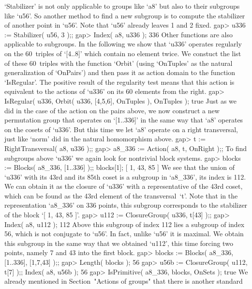 `Stabilizer' is not only applicable to groups like `a8' but also to their
subgroups like  `u56'. So another  method  to find  a  new subgroup is to
compute the stabilizer of another point in `u56'. Note that `u56' already
leaves 1 and 2 fixed.
\beginexample
gap> u336 := Stabilizer( u56, 3 );;
gap> Index( a8, u336 );
336 
\endexample
Other  functions  are also applicable  to  subgroups. In the following we
show that  `u336' operates regularly on the  60~triples of `[4..8]' which
contain no element twice. We  constuct the list  of these 60~triples with
the function `Orbit' (using `OnTuples'  as the natural generalization  of
`OnPairs')  and   then  pass it   as  action domain  to   the function
`IsRegular'.  The positive result of  the regularity test means that this
action is equivalent  to the actions of `u336'  on  its 60 elements
from the right.
\beginexample
gap> IsRegular( u336, Orbit( u336, [4,5,6], OnTuples ), OnTuples );
true 
\endexample
Just as we did in the  case of the  action on the  pairs above, we now
construct a new permutation group that operates on `[1..336]' in the same
way that `a8' operates on the cosets of `u336'. But this time we let `a8'
operate  on a right   transversal, just like  `norm'  did in  the natural
homomorphism above.
\beginexample
gap> t := RightTransversal( a8, u336 );;
gap> a8_336 := Action( a8, t, OnRight );;
\endexample
To find  subgroups above `u336' we again look for nontrivial block systems.
\beginexample
gap> blocks := Blocks( a8_336, [1..336] );; blocks[1];
[ 1, 43, 85 ]
\endexample
We see that the union of `u336' with its 43rd and its 85th coset
is a subgroup in `a8_336', its index is 112.
We can obtain it as the closure of `u336' with a representative
of the  43rd coset, which can be found as the 43rd element
of the transversal~`t'.
Note that in the representation `a8_336' on 336 points,
this subgroup corresponds to the stabilizer of the block `[ 1, 43, 85 ]'.
\beginexample
gap> u112 := ClosureGroup( u336, t[43] );;
gap> Index( a8, u112 );
112 
\endexample
Above this subgroup of index 112 lies a  subgroup  of index 56, which  is
not conjugate to `u56'.  In fact, unlike `u56' it is  maximal.  We obtain
this subgroup in  the same way that we obtained `u112', this time forcing
two points, namely 7 and 43 into the first block.
\beginexample
gap> blocks := Blocks( a8_336, [1..336], [1,7,43] );;
gap> Length( blocks );
56
gap> u56b := ClosureGroup( u112, t[7] );; Index( a8, u56b );
56
gap> IsPrimitive( a8_336, blocks, OnSets );
true 
\endexample
We  already mentioned  in Section~"Actions of groups"
that there is another  standard
